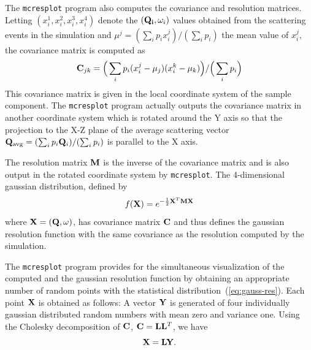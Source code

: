 The \verb+mcresplot+ program also computes the covariance and resolution
matrices. Letting $(x^1_i,x^2_i,x^3_i,x^4_i)$ denote the $({\bf
  Q_i},\omega_i)$ values obtained from the scattering events in the
simulation and $\mu^j = (\sum_i p_i x^j_i) / (\sum_i p_i)$ the mean
value of $x^j_i$, the covariance matrix is computed as
$$ {\bf C}_{jk} = \Big(\sum_i p_i (x^j_i - \mu_j) (x^k_i - \mu_k)\Big) /
   \Big(\sum_i p_i\Big) $$
This covariance matrix is given in the local coordinate system of the
sample component. The \verb+mcresplot+ program actually outputs the
covariance matrix in another coordinate system which is rotated around
the Y axis so that the projection to the X-Z plane of the average
scattering vector ${\bf Q}_{\rm avg} = (\sum_i p_i {\bf Q}_i) / (\sum_i
p_i)$ is parallel to the X axis.

The resolution matrix ${\bf M}$ is the inverse of the covariance matrix
and is also output in the rotated coordinate system by \verb+mcresplot+.
The 4-dimensional gaussian distribution, defined by
\begin{equation}
  \label{eq:gauss-res}
  f({\bf X}) = e^{-\frac{1}{2}{\bf X}^T {\bf M} {\bf X}}
\end{equation}
where ${\bf X} = ({\bf Q},\omega)$, has covariance matrix ${\bf C}$ and
thus defines the gaussian resolution function with the same covariance
as the resolution computed by the simulation.

The \verb+mcresplot+ program provides for the simultaneous visualization
of the computed and the gaussian resolution function by obtaining an
appropriate number of random points with the statistical
distribution~(\ref{eq:gauss-res}). Each point ${\bf X}$ is obtained as
follows: A vector ${\bf Y}$ is generated of four individually gaussian
distributed random numbers with mean zero and variance one. Using the
Cholesky decomposition of ${\bf C}$, ${\bf C} = {\bf L}{\bf L}^T$, we
have
$$ {\bf X} = {\bf L} {\bf Y}.$$



